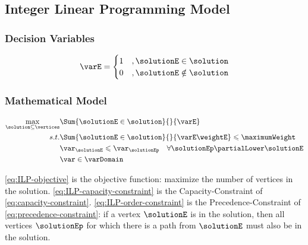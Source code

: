 \subsection{Integer Linear Programming Model}

\subsubsection{Decision Variables}

\begin{equation}
    \label{eq:decision-variables}
    \varE =  \begin{cases}
      1 &, \solutionE \in \solution \\
      0 &, \solutionE \notin \solution
   \end{cases}
\end{equation}

\subsubsection{Mathematical Model}

\begin{align}
    \label{eq:ILP-objective}
    \max\limits_{\solution \subseteq \vertices}
        & \Sum{\solutionE \in \solution}{}{\varE} \\
    s.t.
    \label{eq:ILP-capacity-constraint}
    & \Sum{\solutionE \in \solution}{}{\varE \weightE} \leqslant \maximumWeight \\
    \label{eq:ILP-order-constraint}
    & \var_{\solutionE} \leqslant \var_{\solutionEp} \quad \forall \solutionEp \partialLower \solutionE \\
    \label{eq:ILP-binary-constraint}
    & \var \in \varDomain
\end{align}

\eqref{eq:ILP-objective} is the objective function: maximize the number of vertices in the solution.
\eqref{eq:ILP-capacity-constraint} is the Capacity-Constraint of \eqref{eq:capacity-constraint}.
\eqref{eq:ILP-order-constraint} is the Precedence-Constraint of \eqref{eq:precedence-constraint}: if a vertex $\solutionE$ is in the solution, then all vertices $\solutionEp$ for which there is a path from $\solutionE$ must also be in the solution.

